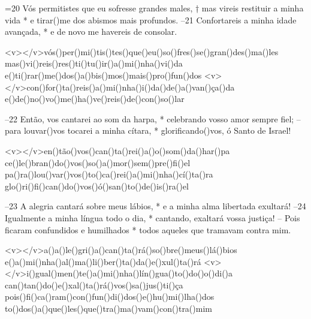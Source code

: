 =20 Vós permitistes que eu sofresse grandes males, †
mas vireis restituir a minha vida *
e tirar()me dos abismos mais profundos.
–21 Confortareis a minha idade avançada, *
e de novo me havereis de consolar.

<v></v>vós()per()mi()tis()tes()que()eu()so()fres()se()gran()des()ma()les
mas()vi()reis()res()ti()tu()ir()a()mi()nha()vi()da
e()ti()rar()me()dos()a()bis()mos()mais()pro()fun()dos
<v></v>con()for()ta()reis()a()mi()nha()i()da()de()a()van()ça()da
e()de()no()vo()me()ha()ve()reis()de()con()so()lar

–22 Então, vos cantarei ao som da harpa, *
celebrando vosso amor sempre fiel;
– para louvar()vos tocarei a minha cítara, *
glorificando()vos, ó Santo de Israel!

<v></v>en()tão()vos()can()ta()rei()a()o()som()da()har()pa
ce()le()bran()do()vos()so()a()mor()sem()pre()fi()el
pa()ra()lou()var()vos()to()ca()rei()a()mi()nha()cí()ta()ra
glo()ri()fi()can()do()vos()ó()san()to()de()is()ra()el

–23 A alegria cantará sobre meus lábios, *
e a minha alma libertada exultará!
–24 Igualmente a minha língua todo o dia, *
cantando, exaltará vossa justiça!
– Pois ficaram confundidos e humilhados *
todos aqueles que tramavam contra mim.

<v></v>a()a()le()gri()a()can()ta()rá()so()bre()meus()lá()bios
e()a()mi()nha()al()ma()li()ber()ta()da()e()xul()ta()rá
<v></v>i()gual()men()te()a()mi()nha()lín()gua()to()do()o()di()a
can()tan()do()e()xal()ta()rá()vos()sa()jus()ti()ça
pois()fi()ca()ram()con()fun()di()dos()e()hu()mi()lha()dos
to()dos()a()que()les()que()tra()ma()vam()con()tra()mim